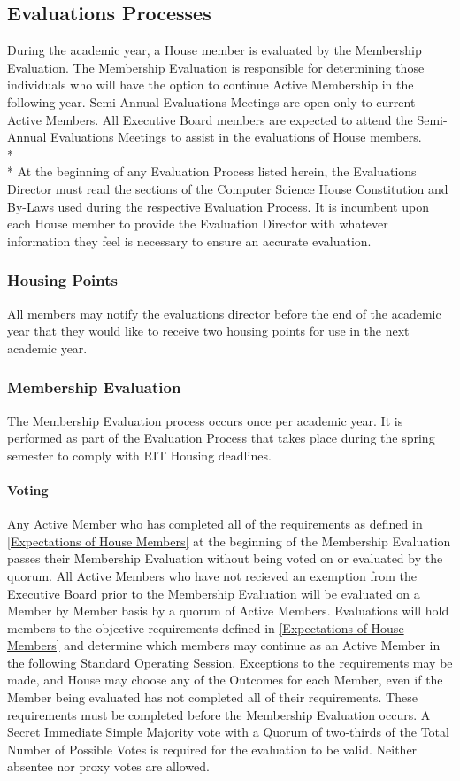 \documentclass{article}
\newcommand{\bsection}[1]{\subsection{#1} \label{#1}}
\newcommand{\bsubsection}[1]{\subsubsection{#1} \label{#1}}
\newcommand{\bsubsubsection}[1]{\paragraph{#1} \label{#1}}
\begin{document}
\bsection{Evaluations Processes}
During the academic year, a House member is evaluated by the Membership Evaluation.
The Membership Evaluation is responsible for determining those individuals who will have the option to continue Active Membership in the following year.
Semi-Annual Evaluations Meetings are open only to current Active Members.
All Executive Board members are expected to attend the Semi-Annual Evaluations Meetings to assist in the evaluations of House members.
\\* \\*
At the beginning of any Evaluation Process listed herein, the Evaluations Director must read the sections of the Computer Science House Constitution and By-Laws used during the respective Evaluation Process.
It is incumbent upon each House member to provide the Evaluation Director with whatever information they feel is necessary to ensure an accurate evaluation.
\bsubsection{Housing Points}
All members may notify the evaluations director before the end of the academic year that they would like to receive two housing points for use in the next academic year.
\bsubsection{Membership Evaluation}
The Membership Evaluation process occurs once per academic year.
It is performed as part of the Evaluation Process that takes place during the spring semester to comply with RIT Housing deadlines.
\bsubsubsection{Voting}
Any Active Member who has completed all of the requirements as defined in \ref{Expectations of House Members} at the beginning of the Membership Evaluation passes their Membership Evaluation without being voted on or evaluated by the quorum.
All Active Members who have not recieved an exemption from the Executive Board prior to the Membership Evaluation will be evaluated on a Member by Member basis by a quorum of Active Members.
Evaluations will hold members to the objective requirements defined in \ref{Expectations of House Members} and determine which members may continue as an Active Member in the following Standard Operating Session.
Exceptions to the requirements may be made, and House may choose any of the Outcomes for each Member, even if the Member being evaluated has not completed all of their requirements.
These requirements must be completed before the Membership Evaluation occurs.
A Secret Immediate Simple Majority vote with a Quorum of two-thirds of the Total Number of Possible Votes is required for the evaluation to be valid.
Neither absentee nor proxy votes are allowed.
\end{document}
